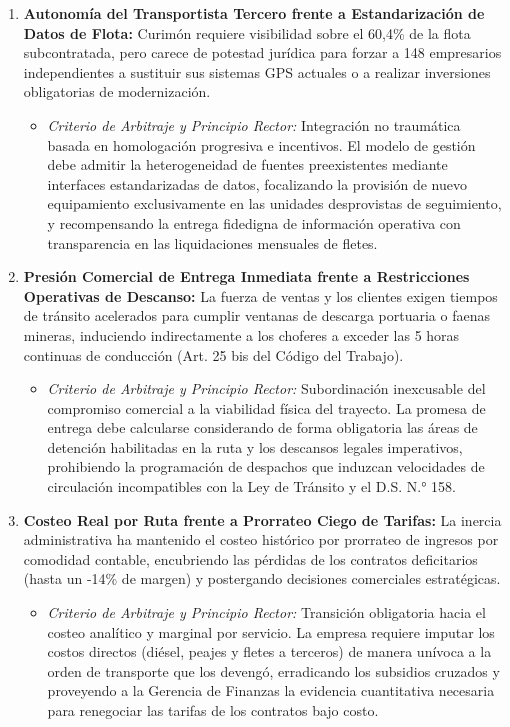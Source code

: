 \begin{enumerate}
\begin{itemize}
  \end{itemize}
  \item \textbf{Autonomía del Transportista Tercero frente a Estandarización de Datos de Flota:} Curimón requiere visibilidad sobre el 60,4\% de la flota subcontratada, pero carece de potestad jurídica para forzar a 148 empresarios independientes a sustituir sus sistemas GPS actuales o a realizar inversiones obligatorias de modernización.
  \begin{itemize}
    \item \textit{Criterio de Arbitraje y Principio Rector:} Integración no traumática basada en homologación progresiva e incentivos. El modelo de gestión debe admitir la heterogeneidad de fuentes preexistentes mediante interfaces estandarizadas de datos, focalizando la provisión de nuevo equipamiento exclusivamente en las unidades desprovistas de seguimiento, y recompensando la entrega fidedigna de información operativa con transparencia en las liquidaciones mensuales de fletes.
  \end{itemize}
  \item \textbf{Presión Comercial de Entrega Inmediata frente a Restricciones Operativas de Descanso:} La fuerza de ventas y los clientes exigen tiempos de tránsito acelerados para cumplir ventanas de descarga portuaria o faenas mineras, induciendo indirectamente a los choferes a exceder las 5 horas continuas de conducción (Art. 25 bis del Código del Trabajo).
  \begin{itemize}
    \item \textit{Criterio de Arbitraje y Principio Rector:} Subordinación inexcusable del compromiso comercial a la viabilidad física del trayecto. La promesa de entrega debe calcularse considerando de forma obligatoria las áreas de detención habilitadas en la ruta y los descansos legales imperativos, prohibiendo la programación de despachos que induzcan velocidades de circulación incompatibles con la Ley de Tránsito y el D.S. N.° 158.
  \end{itemize}
  \item \textbf{Costeo Real por Ruta frente a Prorrateo Ciego de Tarifas:} La inercia administrativa ha mantenido el costeo histórico por prorrateo de ingresos por comodidad contable, encubriendo las pérdidas de los contratos deficitarios (hasta un -14\% de margen) y postergando decisiones comerciales estratégicas.
  \begin{itemize}
    \item \textit{Criterio de Arbitraje y Principio Rector:} Transición obligatoria hacia el costeo analítico y marginal por servicio. La empresa requiere imputar los costos directos (diésel, peajes y fletes a terceros) de manera unívoca a la orden de transporte que los devengó, erradicando los subsidios cruzados y proveyendo a la Gerencia de Finanzas la evidencia cuantitativa necesaria para renegociar las tarifas de los contratos bajo costo.

\end{itemize}
\end{enumerate}
